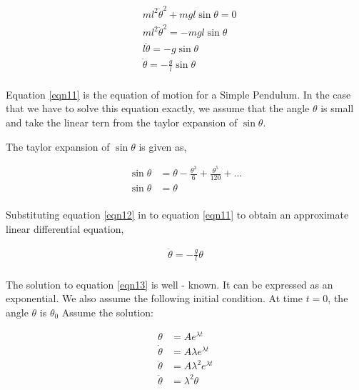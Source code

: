 \documentclass[12pt]{article}
\begin{document}
\begin{equation} \label{eqn11}
    \begin{split}
        & m l^{2} \ddot{\theta}^{2} + mgl\sin{\theta} = 0 \\
        & m l^{2} \ddot{\theta}^{2} = - mgl\sin{\theta} \\
        & l \ddot{\theta} = - g \sin{\theta} \\
        & \ddot{\theta} = - \frac{g}{l} \sin{\theta} \\
    \end{split}
\end{equation}

Equation \ref{eqn11} is the equation of motion for a Simple Pendulum. In the case that we have
to solve this equation exactly, we assume that the angle $\theta$ is small and take the linear tern
from the taylor expansion of $\sin{\theta}$.

The taylor expansion of $\sin{\theta}$ is given as,

\begin{equation} \label{eqn12}
    \begin{split}
       \sin{\theta} &= \theta - \frac{\theta^{3}}{6} + \frac{\theta^{5}}{120} + ... \\
       \sin{\theta} &= \theta \\ 
    \end{split}
\end{equation}

Substituting equation \ref{eqn12} in to equation \ref{eqn11} to obtain an approximate linear differential equation,

\begin{equation} \label{eqn13}
    \begin{split}
        \ddot{\theta} = - \frac{g}{l} \theta \\
    \end{split}
\end{equation}

The solution to equation \ref{eqn13} is well - known. It can be expressed as an exponential. 
We also assume the following initial condition. At time $t = 0$, the angle $\theta$ is 
$ \theta_{0} $ Assume the solution:

\begin{equation} \label{eqn14}
    \begin{split}
        \theta &= A e^{\lambda t} \\
        \dot{\theta} &= A \lambda e^{\lambda t} \\
        \ddot{\theta} &= A \lambda^{2} e^{\lambda t} \\
        \ddot{\theta} &= \lambda^{2} \theta \\
    \end{split}
\end{equation}
\end{document}
